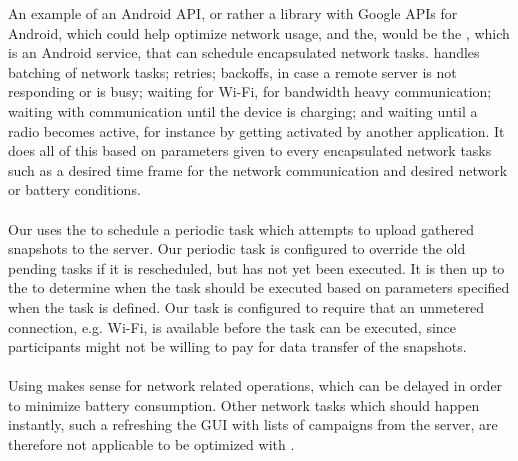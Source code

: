 An example of an Android API, or rather a library with Google APIs for Android, which could help optimize network usage, and the, would be the , which is an Android service, that can schedule encapsulated network tasks.  \parencite{gcmnetworkmanager} handles batching of network tasks; retries; backoffs, in case a remote server is not responding or is busy; waiting for Wi-Fi, for bandwidth heavy communication; waiting with communication until the device is charging; and waiting until a radio becomes active, for instance by getting activated by another application. It does all of this based on parameters given to every encapsulated network tasks such as a desired time frame for the network communication and desired network or battery conditions.  
\\\\
Our  uses the  to schedule a periodic task which attempts to upload gathered snapshots to the server. Our periodic task is configured to override the old pending tasks if it is rescheduled, but has not yet been executed. It is then up to the  to determine when the task should be executed based on parameters specified when the task is defined. Our task is configured to require that an unmetered connection, e.g. Wi-Fi, is available before the task can be executed, since participants might not be willing to pay for data transfer of the snapshots. 
\\\\
Using  makes sense for network related operations, which can be delayed in order to minimize battery consumption. Other network tasks which should happen instantly, such a refreshing the GUI with lists of campaigns from the server, are therefore not applicable to be optimized with . 

